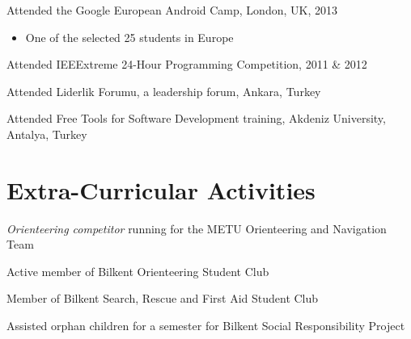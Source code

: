\documentclass[margin]{res} %
\begin{document}
\begin{resume}
		Attended the Google European Android Camp, London, UK, 2013
		\begin{itemize} 
			\item[] One of the selected 25 students in Europe
		\end{itemize}

		Attended IEEExtreme 24-Hour Programming Competition, 2011 \& 2012

		Attended Liderlik Forumu, a leadership forum, Ankara, Turkey 

		Attended Free Tools for Software Development training, Akdeniz University, Antalya, Turkey


	\section{Extra-Curricular Activities} 	
		\resizebox{\textwidth}{!} { {\it Orienteering competitor} running for the METU Orienteering and Navigation Team}

		Active member of Bilkent Orienteering Student Club

		Member of Bilkent Search, Rescue and First Aid Student Club

		Assisted orphan children for a semester for Bilkent Social Responsibility Project

\end{resume}
\end{document}
